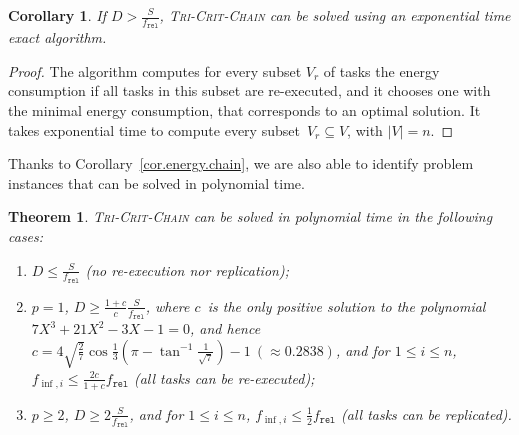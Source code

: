\documentclass[a4paper]{article}
\theoremstyle{plain}
\newtheorem{theorem}{Theorem}
\newtheorem{corollary}{Corollary}
\theoremstyle{definition}
\theoremstyle{remark}
\newcommand{\finf}{\ensuremath{f_{\inf,i}}\xspace}
\newcommand{\fr}{\ensuremath{f_{\texttt{rel}}}\xspace}
\newcommand{\chain}{\textsc{Tri-Crit-Chain}\xspace}
\begin{document}
\begin{corollary}
If $D > \frac{S}{\fr}$, \chain can be solved using an exponential time 
exact algorithm.
\end{corollary}

\begin{proof}
  The algorithm computes for every subset $V_r$ of tasks the energy
  consumption if all tasks in this subset are re-executed, and it
  chooses one with the minimal energy consumption, that corresponds to
  an optimal solution. It takes exponential time to compute every
  subset~$V_r\subseteq V$, with $|V|=n$. 
\end{proof}



Thanks to Corollary~\ref{cor.energy.chain}, we are also able to identify
problem instances that can be solved in polynomial time. 


\begin{theorem}
  \label{thm.chain}
 \chain can be solved in polynomial time in the
 following cases: 
\begin{enumerate}
    \item $D \leq \frac{S}{\fr}$ (no re-execution nor replication);
    \item $p=1$, $D \geq \frac{1+c}{c}\frac{S}{\fr}$, where $c$~is the 
      only positive
      solution to the polynomial $7X^3 + 21 X^2 - 3X -1 = 0$, and
      hence $c = 4 \sqrt{\frac{2}{7}} \cos{\frac{1}{3}(\pi-\tan^{-1}{\frac{1}{\sqrt{7}}})}-1 ~ (\approx 0.2838)$, and 
      for $1\leq i\leq n$, $\finf \leq \frac{2c}{1+c}\fr$ (all
      tasks can be re-executed);
\item $p \geq 2$, $D \geq 2\frac{S}{\fr}$, and 
      for $1\leq i\leq n$, $\finf \leq \frac{1}{2}\fr$ (all tasks can
      be replicated).
\end{enumerate}
\end{theorem}
\end{document}
